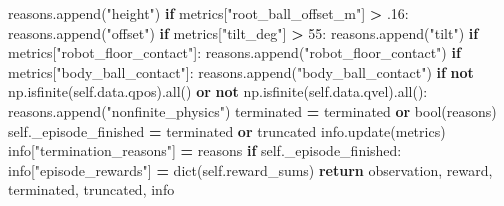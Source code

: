 \documentclass[
  chinese,
  11pt,
  letterpaper,
]{article}
\newenvironment{Shaded}{\begin{snugshade}}{\end{snugshade}}
\newcommand{\BuiltInTok}[1]{#1}
\newcommand{\ControlFlowTok}[1]{\textcolor[rgb]{0.13,0.29,0.53}{\textbf{#1}}}
\newcommand{\DecValTok}[1]{\textcolor[rgb]{0.00,0.00,0.81}{#1}}
\newcommand{\FloatTok}[1]{\textcolor[rgb]{0.00,0.00,0.81}{#1}}
\newcommand{\KeywordTok}[1]{\textcolor[rgb]{0.13,0.29,0.53}{\textbf{#1}}}
\newcommand{\NormalTok}[1]{#1}
\newcommand{\OperatorTok}[1]{\textcolor[rgb]{0.81,0.36,0.00}{\textbf{#1}}}
\newcommand{\StringTok}[1]{\textcolor[rgb]{0.31,0.60,0.02}{#1}}
\newcommand{\VariableTok}[1]{\textcolor[rgb]{0.00,0.00,0.00}{#1}}
\renewenvironment{Shaded}{\par\smallskip}{\par\smallskip}
\begin{document}
\begin{Shaded}
\begin{Highlighting}[]
\NormalTok{            reasons.append(}\StringTok{"height"}\NormalTok{)}
        \ControlFlowTok{if}\NormalTok{ metrics[}\StringTok{"root\_ball\_offset\_m"}\NormalTok{] }\OperatorTok{\textgreater{}} \FloatTok{.16}\NormalTok{:}
\NormalTok{            reasons.append(}\StringTok{"offset"}\NormalTok{)}
        \ControlFlowTok{if}\NormalTok{ metrics[}\StringTok{"tilt\_deg"}\NormalTok{] }\OperatorTok{\textgreater{}} \DecValTok{55}\NormalTok{:}
\NormalTok{            reasons.append(}\StringTok{"tilt"}\NormalTok{)}
        \ControlFlowTok{if}\NormalTok{ metrics[}\StringTok{"robot\_floor\_contact"}\NormalTok{]:}
\NormalTok{            reasons.append(}\StringTok{"robot\_floor\_contact"}\NormalTok{)}
        \ControlFlowTok{if}\NormalTok{ metrics[}\StringTok{"body\_ball\_contact"}\NormalTok{]:}
\NormalTok{            reasons.append(}\StringTok{"body\_ball\_contact"}\NormalTok{)}
        \ControlFlowTok{if} \KeywordTok{not}\NormalTok{ np.isfinite(}\VariableTok{self}\NormalTok{.data.qpos).}\BuiltInTok{all}\NormalTok{() }\KeywordTok{or} \KeywordTok{not}\NormalTok{ np.isfinite(}\VariableTok{self}\NormalTok{.data.qvel).}\BuiltInTok{all}\NormalTok{():}
\NormalTok{            reasons.append(}\StringTok{"nonfinite\_physics"}\NormalTok{)}
\NormalTok{        terminated }\OperatorTok{=}\NormalTok{ terminated }\KeywordTok{or} \BuiltInTok{bool}\NormalTok{(reasons)}
        \VariableTok{self}\NormalTok{.\_episode\_finished }\OperatorTok{=}\NormalTok{ terminated }\KeywordTok{or}\NormalTok{ truncated}
\NormalTok{        info.update(metrics)}
\NormalTok{        info[}\StringTok{"termination\_reasons"}\NormalTok{] }\OperatorTok{=}\NormalTok{ reasons}
        \ControlFlowTok{if} \VariableTok{self}\NormalTok{.\_episode\_finished:}
\NormalTok{            info[}\StringTok{"episode\_rewards"}\NormalTok{] }\OperatorTok{=} \BuiltInTok{dict}\NormalTok{(}\VariableTok{self}\NormalTok{.reward\_sums)}
        \ControlFlowTok{return}\NormalTok{ observation, reward, terminated, truncated, info}


\end{Highlighting}
\end{Shaded}
\end{document}
